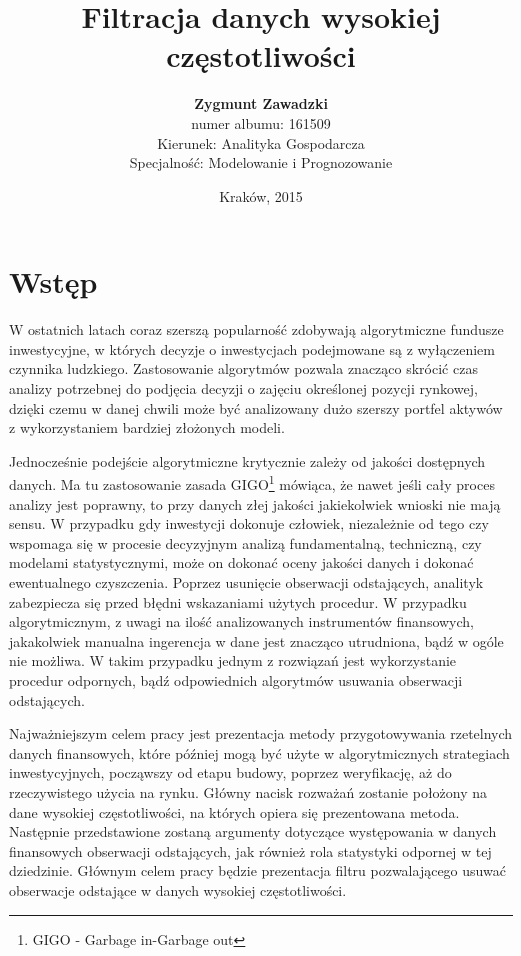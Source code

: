 \documentclass[a4paper,12pt,openany, DIV=calc, headsepline]{scrbook}
\author{{\LARGE \textbf{Zygmunt Zawadzki}}\\
numer albumu: 161509\\
Kierunek: Analityka Gospodarcza\\
Specjalność: Modelowanie i Prognozowanie}
\title{Filtracja danych wysokiej częstotliwości}
\date{Kraków, 2015}
\begin{document}
\maketitle

%

\tableofcontents
\chapter*{Wstęp}


W ostatnich latach coraz szerszą popularność zdobywają algorytmiczne fundusze inwestycyjne, w których decyzje o inwestycjach podejmowane są z wyłączeniem czynnika ludzkiego. Zastosowanie algorytmów pozwala znacząco skrócić czas analizy potrzebnej do podjęcia decyzji o zajęciu określonej pozycji rynkowej, dzięki czemu w danej chwili może być analizowany dużo szerszy portfel aktywów z wykorzystaniem bardziej złożonych modeli. 

Jednocześnie podejście algorytmiczne krytycznie zależy od jakości dostępnych danych. Ma tu zastosowanie zasada GIGO\footnote{GIGO - Garbage in-Garbage out} mówiąca, że nawet jeśli cały proces analizy jest poprawny, to przy danych złej jakości jakiekolwiek wnioski nie mają sensu. W przypadku gdy inwestycji dokonuje człowiek, niezależnie od tego czy wspomaga się w procesie decyzyjnym analizą fundamentalną, techniczną, czy modelami statystycznymi, może on dokonać oceny jakości danych i dokonać ewentualnego czyszczenia. Poprzez usunięcie obserwacji odstających, analityk zabezpiecza się przed błędni wskazaniami użytych procedur. W przypadku algorytmicznym, z uwagi na ilość analizowanych instrumentów finansowych, jakakolwiek manualna ingerencja w dane jest znacząco utrudniona, bądź w ogóle nie możliwa. W takim przypadku jednym z rozwiązań jest wykorzystanie procedur odpornych, bądź odpowiednich algorytmów usuwania obserwacji odstających.

Najważniejszym celem pracy jest prezentacja metody przygotowywania rzetelnych danych finansowych, które później mogą być użyte w algorytmicznych strategiach inwestycyjnych, począwszy od etapu budowy, poprzez weryfikację, aż do rzeczywistego użycia na rynku. Główny nacisk rozważań zostanie położony na dane wysokiej częstotliwości, na których opiera się prezentowana metoda. Następnie przedstawione zostaną argumenty dotyczące występowania w danych finansowych obserwacji odstających, jak również rola statystyki odpornej w tej dziedzinie. Głównym celem pracy będzie prezentacja filtru pozwalającego usuwać obserwacje odstające w danych wysokiej częstotliwości.
\end{document}

